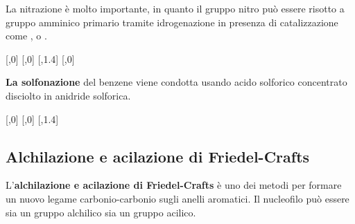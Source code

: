 La nitrazione è molto importante, in quanto il gruppo nitro può essere risotto a gruppo amminico primario tramite idrogenazione in presenza di catalizzazione come ,  o .
{\small
\begin{reaction}
	[,0]
	[,0]
	[,1.4]
	 [,0]\+ 
\end{reaction}}

\textbf{La solfonazione} del benzene viene condotta usando acido solforico concentrato disciolto in anidride solforica.
\begin{reaction}
	[,0]
	 [,0]\+ 
	\arrow{->[\chemfig{H_2SO_4}]}[,1.4]
\end{reaction}

\subsection{Alchilazione e acilazione di Friedel-Crafts}
L'\textbf{alchilazione e acilazione di Friedel-Crafts} è uno dei metodi per formare un nuovo legame carbonio-carbonio sugli anelli aromatici. Il nucleofilo può essere sia un gruppo alchilico sia un gruppo acilico.

